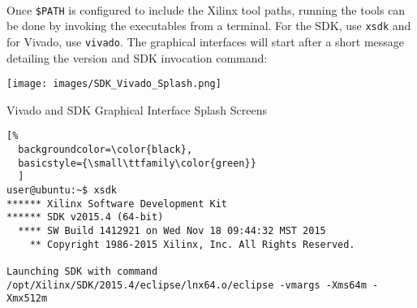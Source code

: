 ~\\
\noindent
Once \texttt{\$PATH} is configured to include the Xilinx tool paths, running the tools can be done by invoking the executables from a terminal. For the SDK, use \texttt{xsdk} and for Vivado, use \texttt{vivado}. The graphical interfaces will start after a short message detailing the version and SDK invocation command:

\begin{marginfigure}
	\centering
	\texttt{[image: images/SDK\_Vivado\_Splash.png]}
	\caption[Vivado and SDK Graphical Interface Splash Screens]{Vivado and SDK Graphical Interface Splash Screens}
\end{marginfigure}


\begin{lstlisting}[%
  backgroundcolor=\color{black},
  basicstyle={\small\ttfamily\color{green}}
  ]
user@ubuntu:~$ xsdk
****** Xilinx Software Development Kit
****** SDK v2015.4 (64-bit)
  **** SW Build 1412921 on Wed Nov 18 09:44:32 MST 2015
    ** Copyright 1986-2015 Xilinx, Inc. All Rights Reserved.

Launching SDK with command /opt/Xilinx/SDK/2015.4/eclipse/lnx64.o/eclipse -vmargs -Xms64m -Xmx512m
\end{lstlisting}



